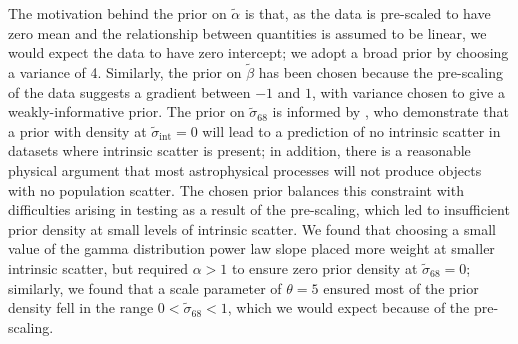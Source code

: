 \documentclass[fleqn,usenatbib]{rasti}
\newcommand{\intercept}{\alpha}
\begin{document}
The motivation behind the prior on $\tilde{\intercept}$ is that, as the data is
pre-scaled to have zero mean and the relationship between quantities is assumed
to be linear, we would expect the data to have zero intercept; we adopt a broad
prior by choosing a variance of 4. Similarly, the prior on $\tilde{\beta}$ has
been chosen because the pre-scaling of the data suggests a gradient between $-1$
and $1$, with variance chosen to give a weakly-informative prior. The prior on
$\tilde{\sigma}_{68}$ is informed by \citet{Chung:2013}, who demonstrate that a
prior with density at $\tilde{\sigma}_{\text{int}} = 0$ will lead to a
prediction of no intrinsic scatter in datasets where intrinsic scatter is
present; in addition, there is a reasonable physical argument that most
astrophysical processes will not produce objects with no population scatter. The
chosen prior balances this constraint with difficulties arising in testing as a
result of the pre-scaling, which led to insufficient prior density at small
levels of intrinsic scatter. We found that choosing a small value of the gamma
distribution power law slope placed more weight at smaller intrinsic scatter,
but required $\alpha > 1$ to ensure zero prior density at $\tilde{\sigma}_{68} =
0$; similarly, we found that a scale parameter of $\theta = 5$ ensured most of
the prior density fell in the range $0 < \tilde{\sigma}_{68} < 1$, which we
would expect because of the pre-scaling.
\end{document}
